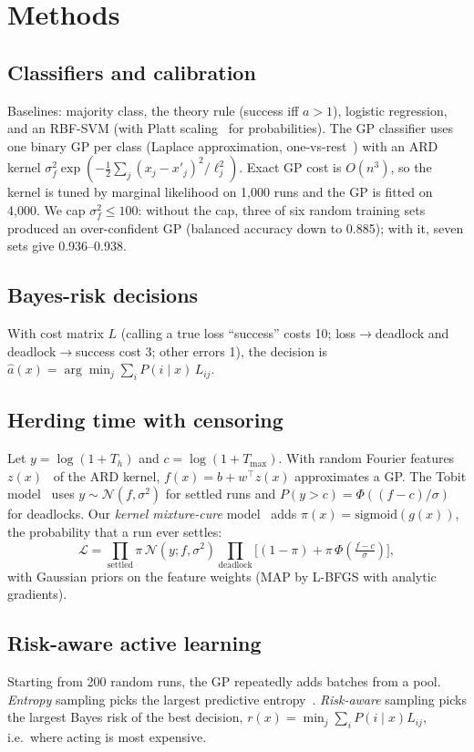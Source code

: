 \documentclass[conference]{IEEEtran}
\begin{document}
\section{Methods}
\subsection{Classifiers and calibration}
Baselines: majority class, the theory rule (success iff $a>1$), logistic regression, and an RBF-SVM (with Platt
scaling~\cite{platt1999} for probabilities). The GP classifier uses one binary GP per class (Laplace approximation,
one-vs-rest~\cite{rasmussen2006gpml}) with an ARD kernel $\sigma_f^2\exp(-\tfrac12\sum_j (x_j-x'_j)^2/\ell_j^2)$.
Exact GP cost is $O(n^3)$, so the kernel is tuned by marginal likelihood on 1{,}000 runs and the GP is fitted on
4{,}000. We cap $\sigma_f^2\le100$: without the cap, three of six random training sets produced an over-confident
GP (balanced accuracy down to 0.885); with it, seven sets give 0.936--0.938.

\subsection{Bayes-risk decisions}
With cost matrix $L$ (calling a true loss ``success'' costs 10; loss$\to$deadlock and deadlock$\to$success cost 3;
other errors 1), the decision is $\hat a(x)=\arg\min_j \sum_i P(i\mid x)\,L_{ij}$.

\subsection{Herding time with censoring}
Let $y=\log(1+T_h)$ and $c=\log(1+T_{\max})$. With random Fourier features $z(x)$~\cite{rahimi2007rff} of the ARD
kernel, $f(x)=b+w^\top z(x)$ approximates a GP. The Tobit model~\cite{tobin1958} uses $y\sim\mathcal{N}(f,\sigma^2)$
for settled runs and $P(y>c)=\Phi((f-c)/\sigma)$ for deadlocks. Our \emph{kernel mixture-cure} model~\cite{farewell1982}
adds $\pi(x)=\mathrm{sigmoid}(g(x))$, the probability that a run ever settles:
\begin{equation}
\mathcal{L}=\prod_{\text{settled}} \pi\,\mathcal{N}(y;f,\sigma^2)\prod_{\text{deadlock}}\big[(1-\pi)+\pi\,\Phi(\tfrac{f-c}{\sigma})\big],
\end{equation}
with Gaussian priors on the feature weights (MAP by L-BFGS with analytic gradients).

\subsection{Risk-aware active learning}
Starting from 200 random runs, the GP repeatedly adds batches from a pool. \emph{Entropy} sampling picks the largest
predictive entropy~\cite{settles2009}. \emph{Risk-aware} sampling picks the largest Bayes risk of the best decision,
$r(x)=\min_j\sum_i P(i\mid x)L_{ij}$, i.e.\ where acting is most expensive.
\end{document}
